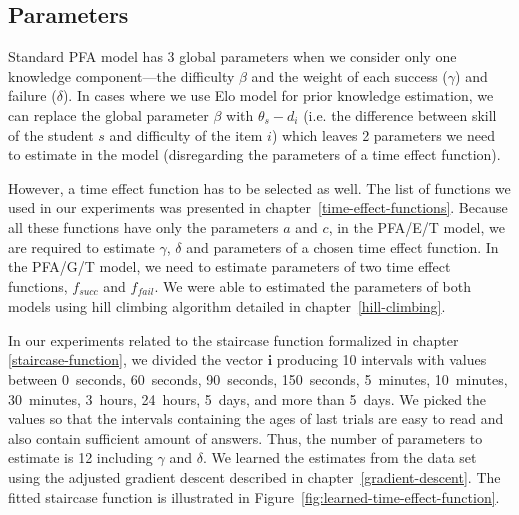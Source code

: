 \subsection{Parameters}
\label{memory-parameters}

Standard PFA model has 3 global parameters when we consider only one knowledge component---the difficulty $\beta$ and the weight of each success ($\gamma$) and failure ($\delta$). In cases where we use Elo model for prior knowledge estimation, we can replace the global parameter $\beta$ with $\theta_s - d_i$ (i.e. the difference between skill of the student $s$ and difficulty of the item $i$) which leaves 2 parameters we need to estimate in the model (disregarding the parameters of a time effect function).

However, a time effect function has to be selected as well. The list of functions we used in our experiments was presented in chapter~\ref{time-effect-functions}. Because all these functions have only the parameters $a$ and $c$, in the PFA/E/T model, we are required to estimate $\gamma$, $\delta$ and parameters of a chosen time effect function. In the PFA/G/T model, we need to estimate parameters of two time effect functions, $f_{\mathit{succ}}$ and $f_{\mathit{fail}}$. We were able to estimated the parameters of both models using hill climbing algorithm detailed in chapter~\ref{hill-climbing}.

In our experiments related to the staircase function formalized in chapter \ref{staircase-function}, we divided the vector $\textbf{i}$ producing 10 intervals with values between 0~seconds, 60~seconds, 90~seconds, 150~seconds, 5~minutes, 10~minutes, 30~minutes, 3~hours, 24~hours, 5~days, and more than 5~days. We picked the values so that the intervals containing the ages of last trials are easy to read and also contain sufficient amount of answers. Thus, the number of parameters to estimate is 12 including $\gamma$ and $\delta$. We learned the estimates from the data set using the adjusted gradient descent described in chapter~\ref{gradient-descent}. The fitted staircase function is illustrated in Figure~\ref{fig:learned-time-effect-function}.


